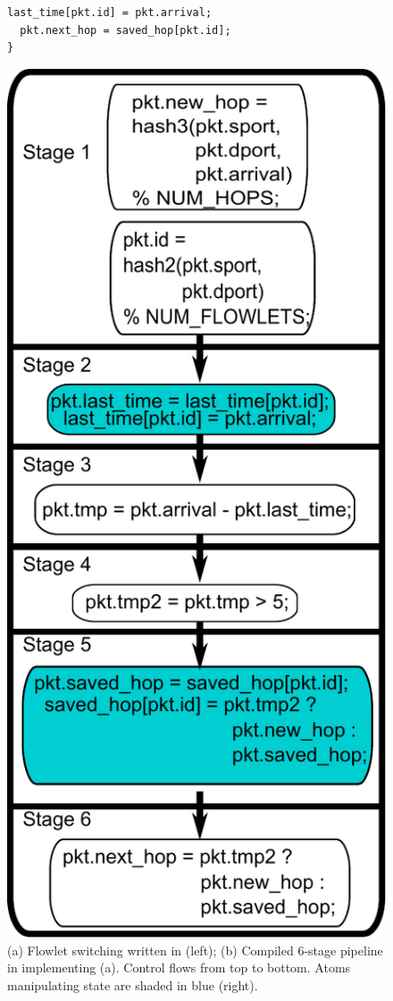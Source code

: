 \begin{figure}[!t]
\begin{minipage}{0.6\textwidth}
\begin{small}
\begin{lstlisting}[style=customc]
  last_time[pkt.id] = pkt.arrival;
  pkt.next_hop = saved_hop[pkt.id];
}
\end{lstlisting}
\end{small}
\end{minipage}
%
\vrule\quad
%
\begin{minipage}{0.4\textwidth}
\includegraphics[width=0.8\columnwidth]{pipe.pdf}
\end{minipage}
\caption{\small (a) Flowlet switching written in \pktlanguage (left);
(b) Compiled 6-stage pipeline in \absmachine implementing (a).  Control flows
from top to bottom. Atoms manipulating state are shaded in blue (right).}
\label{fig:flowlet}
\end{figure}


